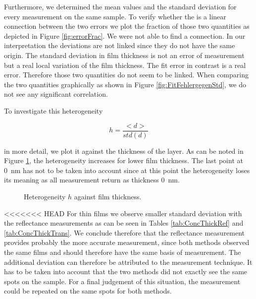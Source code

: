 Furthermore, we determined the mean values and the standard deviation for every measurement on the same sample. To verify whether the is a 
linear connection between the two errors we plot the fraction of those two quantities as depicted in Figure \ref{fig:errorFrac}. We were not able to find a connection.
In our interpretation the deviations are not linked since they do not have the same origin. The standard deviation in film thickness is 
not an error of measurement but a real local variation of the film thickness. The fit error in contrast is a real error. Therefore those two quantities do not seem to be linked. When
comparing the two quantities graphically as shown in Figure \ref{fig:FitFehlergegenStd}, we do not see any significant correlation.



To investigate this heterogeneity

\begin{equation}
    h = \frac{< d >}{std(d)}
\end{equation}

in more detail, we plot it against the thickness of the layer. As can be noted in Figure \ref{fig:thickheter}, the heterogeneity
increases for lower film thickness. The last point at \SI{0}{\nano\meter} has not to be taken into account since at this point the heterogeneity loses its meaning as all measurement 
return as thickness \SI{0}{\nano\meter}.

\begin{figure}[h]
    \centering
    
    \caption{Heterogeneity $h$ against film thickness.}
    \label{fig:thickheter}
\end{figure}

<<<<<<< HEAD
For thin films we observe smaller standard deviation with the reflectance measurements as can be seen in Tables \ref{tab:ConcThickRef} and \ref{tab:ConcThickTrans}. We conclude therefore that the reflectance 
measurement provides probably the more accurate measurement, since both methods observed the same films and should therefore have the same basis of measurement. The additional deviation can therefore be 
attributed to the measurement technique. It has to be taken into account that the two methods did not exactly see the same spots on the sample. For a final judgement of this situation, the measurement could be 
repeated on the same spots for both methods.


